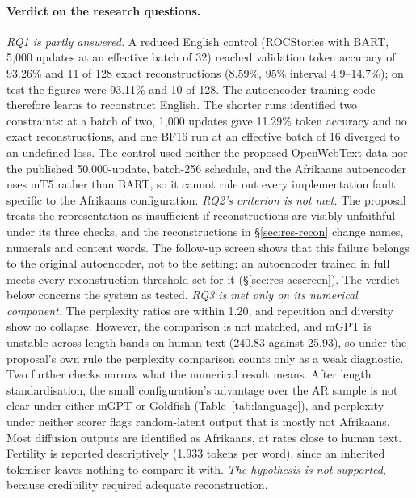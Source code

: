 \documentclass[11pt,a4paper]{article}
\begin{document}
\paragraph{Verdict on the research questions.}
\emph{RQ1 is partly answered.} A reduced English control (ROCStories with BART, 5,000 updates at an effective batch of 32) reached validation token accuracy of 93.26\% and 11 of 128 exact reconstructions (8.59\%, 95\% interval 4.9--14.7\%); on test the figures were 93.11\% and 10 of 128. The autoencoder training code therefore learns to reconstruct English. The shorter runs identified two constraints: at a batch of two, 1,000 updates gave 11.29\% token accuracy and no exact reconstructions, and one BF16 run at an effective batch of 16 diverged to an undefined loss. The control used neither the proposed OpenWebText data nor the published 50,000-update, batch-256 schedule, and the Afrikaans autoencoder uses mT5 rather than BART, so it cannot rule out every implementation fault specific to the Afrikaans configuration. \emph{RQ2's criterion is not met.} The proposal treats the representation as insufficient if reconstructions are visibly unfaithful under its three checks, and the reconstructions in \S\ref{sec:res-recon} change names, numerals and content words. The follow-up screen shows that this failure belongs to the original autoencoder, not to the setting: an autoencoder trained in full meets every reconstruction threshold set for it (\S\ref{sec:res-aescreen}). The verdict below concerns the system as tested. \emph{RQ3 is met only on its numerical component.} The perplexity ratios are within 1.20, and repetition and diversity show no collapse. However, the comparison is not matched, and mGPT is unstable across length bands on human text (240.83 against 25.93), so under the proposal's own rule the perplexity comparison counts only as a weak diagnostic. Two further checks narrow what the numerical result means. After length standardisation, the small configuration's advantage over the AR sample is not clear under either mGPT or Goldfish (Table~\ref{tab:language}), and perplexity under neither scorer flags random-latent output that is mostly not Afrikaans. Most diffusion outputs are identified as Afrikaans, at rates close to human text. Fertility is reported descriptively (1.933 tokens per word), since an inherited tokeniser leaves nothing to compare it with. \emph{The hypothesis is not supported}, because credibility required adequate reconstruction.
\end{document}
